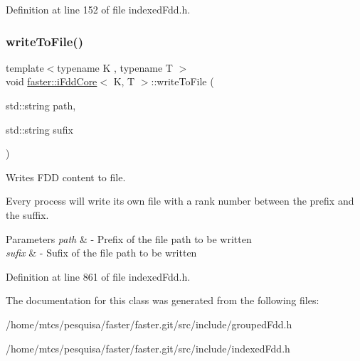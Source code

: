 Definition at line 152 of file indexed\+Fdd.\+h.

\hypertarget{classfaster_1_1iFddCore_a6058211f45b0f603ff6e2ffab1976148}{}\label{classfaster_1_1iFddCore_a6058211f45b0f603ff6e2ffab1976148} 
\subsubsection{\texorpdfstring{write\+To\+File()}{writeToFile()}}
{\footnotesize\ttfamily template$<$typename K , typename T $>$ \\
void \hyperlink{classfaster_1_1iFddCore}{faster\+::i\+Fdd\+Core}$<$ K, T $>$\+::write\+To\+File (\begin{DoxyParamCaption}\item[{std\+::string}]{path,  }\item[{std\+::string}]{sufix }\end{DoxyParamCaption})}



Writes F\+DD content to file. 

Every process will write its own file with a rank number between the prefix and the suffix.


\begin{DoxyParams}{Parameters}
{\em path} & -\/ Prefix of the file path to be written \\
\hline
{\em sufix} & -\/ Sufix of the file path to be written \\
\hline
\end{DoxyParams}


Definition at line 861 of file indexed\+Fdd.\+h.



The documentation for this class was generated from the following files\+:\begin{DoxyCompactItemize}
\item 
/home/mtcs/pesquisa/faster/faster.\+git/src/include/grouped\+Fdd.\+h\item 
/home/mtcs/pesquisa/faster/faster.\+git/src/include/indexed\+Fdd.\+h\end{DoxyCompactItemize}
